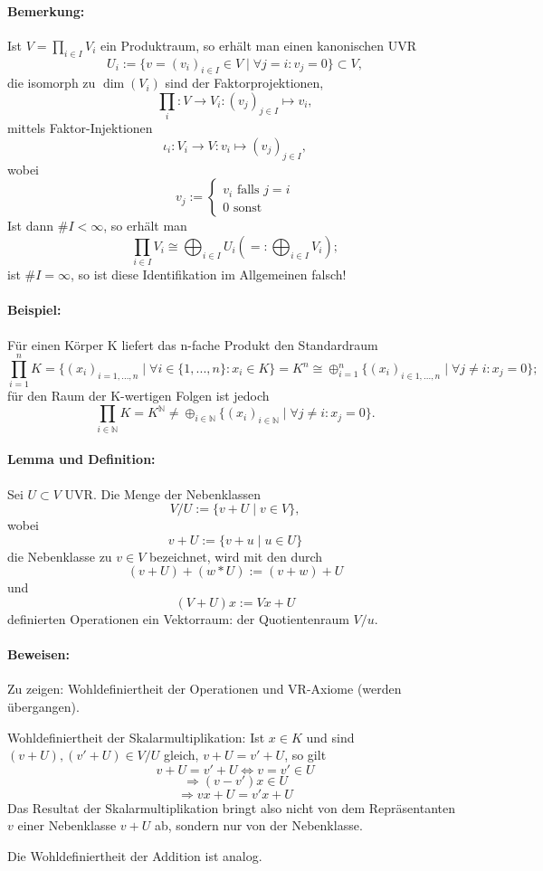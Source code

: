 \paragraph{Bemerkung: } 
		Ist $V = \prod_{i\in I} V_i$ ein Produktraum, so erhält man einen kanonischen UVR
			\[U_i:=\{v=(v_i)_{i\in I}\in V\mid\forall j = i:v_j = 0\}\subset V,\]
		die isomorph zu $\dim(V_i)$ sind der Faktorprojektionen,
			\[\prod_i:V\to V_i:(v_j)_{j\in I} \mapsto v_i,\]
		mittels Faktor-Injektionen
			\[\iota_i:V_i\to V: v_i \mapsto(v_j)_{j\in I},\]
		wobei
			\[v_j :=
				\begin{cases}
					v_i \text{ falls } j=i\\
					0 \text{ sonst}
				\end{cases}
			\]
		Ist dann $\# I < \infty$, so erhält man
			\[\prod_{i\in I} V_i\cong \bigoplus_{i\in I}U_i (=: \bigoplus_{i\in I}V_i);\]
		ist $\#I=\infty$, so ist diese Identifikation im Allgemeinen falsch!
	
\paragraph{Beispiel: }
	Für einen Körper K liefert das n-fache Produkt den Standardraum
		\[\prod_{i=1}^{n}K = \{(x_i)_{i = 1,...,n}\mid\forall i \in \{1,...,n\}: x_i \in K\} = K^n \cong \oplus_{i=1}^n\{(x_i)_{i\in {1,...,n}}\mid\forall j\neq i: x_j = 0\};\]
	für den Raum der K-wertigen Folgen ist jedoch
		\[\prod_{i\in \mathbb{N}}K=K^{\mathbb{N}}\neq\oplus_{i\in \mathbb{N}}\{(x_i)_{i\in \mathbb{N}}\mid\forall j\neq i: x_j=0\}.\]
			
\paragraph{Lemma und Definition: }
	Sei $U\subset V$ UVR. Die Menge der Nebenklassen 
		\[V/U := \{v+U\mid v\in V\},\]
	wobei
		\[v+U:=\{v+u\mid u\in U\}\]
	die Nebenklasse zu $v\in V$ bezeichnet, wird mit den durch
		\[(v+U)+(w*U):=(v+w)+U\]
	und
		\[(V+U)x := Vx + U\]
	definierten Operationen ein Vektorraum: der Quotientenraum $V/u$.
			
\paragraph{Beweisen: }
	Zu zeigen: Wohldefiniertheit der Operationen und VR-Axiome (werden übergangen).
	
	Wohldefiniertheit der Skalarmultiplikation: Ist $x\in K$ und sind $(v+U),(v'+U)\in V/U$ gleich, $v+U = v' + U$, so gilt
		\[v+U = v'+U \Leftrightarrow v = v'\in U\] \[\Rightarrow (v-v')x \in U\]
		\[\Rightarrow vx+U=v' x+U\]
	Das Resultat der Skalarmultiplikation bringt also nicht von dem Repräsentanten $v$ einer Nebenklasse $v+U$ ab, sondern nur von der Nebenklasse.
	
	Die Wohldefiniertheit der Addition ist analog.

